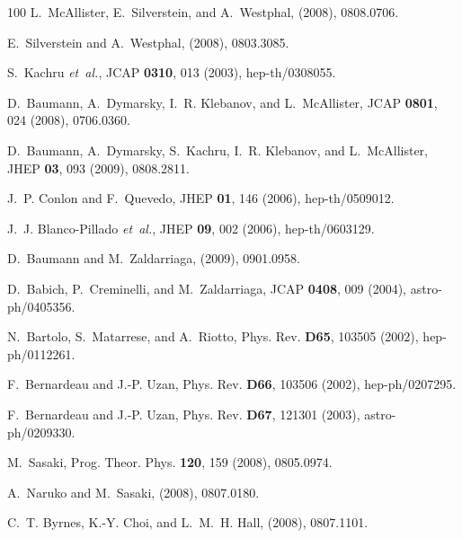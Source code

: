 \documentclass[12pt,letterpaper,rotate]{article}
\begin{document}
{\begin{thebibliography}{100}
L.~McAllister, E.~Silverstein, and A.~Westphal,
\newblock (2008), 0808.0706.

E.~Silverstein and A.~Westphal,
\newblock (2008), 0803.3085.

S.~Kachru {\em et~al.},
\newblock JCAP {\bf 0310}, 013 (2003), hep-th/0308055.

D.~Baumann, A.~Dymarsky, I.~R. Klebanov, and L.~McAllister,
\newblock JCAP {\bf 0801}, 024 (2008), 0706.0360.

D.~Baumann, A.~Dymarsky, S.~Kachru, I.~R. Klebanov, and L.~McAllister,
\newblock JHEP {\bf 03}, 093 (2009), 0808.2811.

J.~P. Conlon and F.~Quevedo,
\newblock JHEP {\bf 01}, 146 (2006), hep-th/0509012.

J.~J. Blanco-Pillado {\em et~al.},
\newblock JHEP {\bf 09}, 002 (2006), hep-th/0603129.

D.~Baumann and M.~Zaldarriaga,
\newblock (2009), 0901.0958.

D.~Babich, P.~Creminelli, and M.~Zaldarriaga,
\newblock JCAP {\bf 0408}, 009 (2004), astro-ph/0405356.

N.~Bartolo, S.~Matarrese, and A.~Riotto,
\newblock Phys. Rev. {\bf D65}, 103505 (2002), hep-ph/0112261.

F.~Bernardeau and J.-P. Uzan,
\newblock Phys. Rev. {\bf D66}, 103506 (2002), hep-ph/0207295.

F.~Bernardeau and J.-P. Uzan,
\newblock Phys. Rev. {\bf D67}, 121301 (2003), astro-ph/0209330.

M.~Sasaki,
\newblock Prog. Theor. Phys. {\bf 120}, 159 (2008), 0805.0974.

A.~Naruko and M.~Sasaki,
\newblock (2008), 0807.0180.

C.~T. Byrnes, K.-Y. Choi, and L.~M.~H. Hall,
\newblock (2008), 0807.1101.


\end{thebibliography}}
\end{document}

